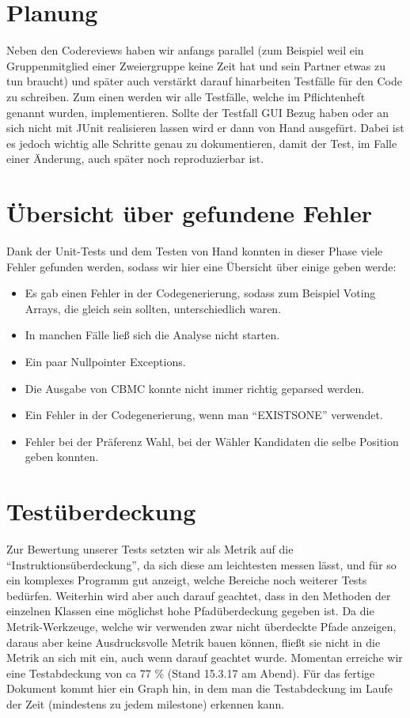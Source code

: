 \documentclass[a4paper]{scrreprt}
\begin{document}
\section{Planung}
Neben den Codereviews haben wir anfangs parallel (zum
Beispiel weil ein Gruppenmitglied einer Zweiergruppe keine Zeit hat und sein
Partner etwas zu tun braucht) und später auch
verstärkt darauf hinarbeiten Testfälle für den Code zu schreiben.
Zum einen werden wir alle Testfälle, welche im Pflichtenheft genannt wurden,
implementieren. Sollte der Testfall GUI Bezug haben oder an sich nicht mit JUnit
realisieren lassen wird er dann von Hand ausgefürt. Dabei ist es jedoch wichtig alle Schritte genau zu
dokumentieren, damit der Test, im Falle einer Änderung, auch später noch
reproduzierbar ist.

\section{Übersicht über gefundene Fehler}
Dank der Unit-Tests und dem Testen von Hand konnten in dieser Phase  viele
Fehler gefunden werden, sodass wir hier eine Übersicht über einige geben werde:

\begin{itemize}
  \item Es gab einen Fehler in der Codegenerierung, sodass zum Beispiel Voting
  Arrays, die gleich sein sollten, unterschiedlich waren.
  \item In manchen Fälle ließ sich die Analyse nicht starten.
  \item Ein paar Nullpointer Exceptions.
  \item Die Ausgabe von CBMC konnte nicht immer richtig geparsed werden.
  \item Ein Fehler in der Codegenerierung, wenn man "`EXISTSONE"' verwendet.
  \item Fehler bei der Präferenz Wahl, bei der Wähler Kandidaten die selbe
  Position geben konnten.
\end{itemize}


\section{Testüberdeckung}
Zur Bewertung unserer Tests setzten wir als Metrik auf die
"`Instruktionsüberdeckung"', da sich diese am leichtesten messen lässt, und für
so ein komplexes Programm gut anzeigt, welche Bereiche noch weiterer Tests
bedürfen.
Weiterhin wird aber auch darauf geachtet, dass in den Methoden der einzelnen Klassen eine möglichst hohe
Pfadüberdeckung gegeben ist. Da die Metrik-Werkzeuge, welche wir verwenden zwar
nicht überdeckte Pfade anzeigen, daraus aber keine Ausdrucksvolle Metrik bauen
können, fließt sie nicht in die Metrik an sich mit ein, auch wenn darauf
geachtet wurde.
\newline
Momentan erreiche wir eine Testabdeckung von ca 77 \% (Stand 15.3.17 am Abend).
Für das fertige Dokument kommt hier ein Graph hin, in dem man die Testabdeckung
im Laufe der Zeit (mindestens zu jedem milestone) erkennen kann.
\end{document}
